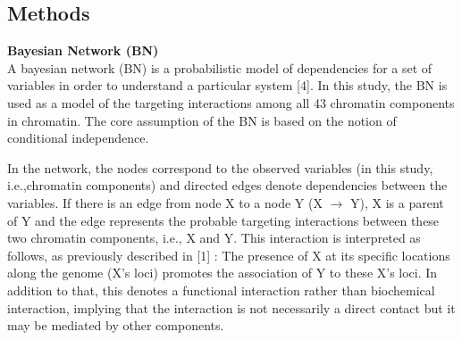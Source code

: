 \documentclass{bioinfo}
\begin{document}
\begin{methods}

\section{Methods}
\textbf{Bayesian Network (BN)}\\
A bayesian network (BN) is a probabilistic model of dependencies for a set of variables in order to understand a particular system [4]. In this study, the BN is used as a model of the targeting interactions among all 43 chromatin components in chromatin. The core assumption of the BN is based on the notion of conditional independence.  

In the network, the nodes correspond to the observed variables (in this study, i.e.,chromatin components) and directed edges denote dependencies between the variables. If there is an edge from node X to a node Y (X \(\rightarrow\) Y), X is a parent of Y and the edge represents the probable targeting interactions between these two chromatin components, i.e., X and Y. This interaction is interpreted as follows, as previously described in [1] : The presence of X at its specific locations along the genome (X's loci) promotes the association of Y to these X's loci. In addition to that, this denotes a functional interaction rather than biochemical interaction, implying that the interaction is not necessarily a direct contact but it may be mediated by other components.


\end{methods}
\end{document}
